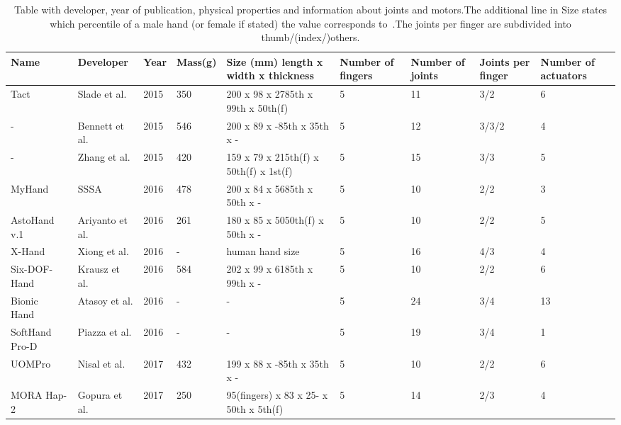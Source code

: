 \documentclass[a4paper, 10pt, conference]{ieeeconf}      %
\begin{document}
\begin{table}

\begin{tabular}{p{2.4cm}|p{1.8cm}|p{0.8cm}|p{1cm}|p{2.6cm}|p{1.2cm}|p{1.2cm}|p{1.2cm}|p{1.2cm}}

Name & Developer & Year & Mass(g) & Size (mm) length x width x thickness & Number of fingers & Number of joints & Joints per finger & Number of actuators\\
\hline
Tact~\cite{tact} & Slade et al. & 2015 & 350 & 200 x 98 x 27\newline 85th x 99th x 50th(f) & 5 & 11 & 3/2 & 6\\
\hline
-~\cite{bennett} & Bennett et al. & 2015 & 546 & 200 x 89 x -\newline 85th x 35th x - & 5 & 12 & 3/3/2 & 4\\
\hline
-~\cite{zhang} & Zhang et al. & 2015 & 420 & 159 x 79 x 21\newline 5th(f) x 50th(f) x 1st(f) & 5 & 15 & 3/3 & 5\\
\hline
MyHand~\cite{myhand} & SSSA & 2016 & 478 & 200 x 84 x 56\newline 85th x 50th x - & 5 & 10 & 2/2 & 3\\
\hline
AstoHand v.1~\cite{astohand} & Ariyanto et al. & 2016 & 261 & 180 x 85 x 50\newline 50th(f) x 50th x - & 5 & 10 & 2/2 & 5\\
\hline
X-Hand~\cite{xhand}& Xiong et al. & 2016 & - & human hand size & 5 & 16 & 4/3 & 4\\
\hline
Six-DOF-Hand~\cite{6dofhand} & Krausz et al. & 2016 & 584 & 202 x 99 x 61\newline 85th x 99th x - & 5 & 10 & 2/2 & 6\\
\hline
Bionic Hand~\cite{bionichand} & Atasoy et al. & 2016 & - & - & 5 & 24 & 3/4 & 13\\
\hline
SoftHand Pro-D~\cite{softhand} & Piazza et al. & 2016 & - & - & 5 & 19 & 3/4 & 1\\
\hline
UOMPro~\cite{uompro} & Nisal et al. & 2017 & 432 & 199 x 88 x -\newline 85th x 35th x - & 5 & 10 & 2/2 & 6\\
\hline
MORA Hap-2~\cite{morahap2} & Gopura et al. & 2017 & 250 & 95(fingers) x 83 x 25\newline - x 50th x 5th(f) & 5 & 14 & 2/3 & 4\\


\end{tabular}

\caption{Table with developer, year of publication, physical properties and information about joints and motors.\newline The additional line in Size states which percentile of a male hand (or female if stated) the value corresponds to~\cite{garrett}.\newline The joints per finger are subdivided into thumb/(index/)others.}
\label{table:table1}

\end{table}
\end{document}
